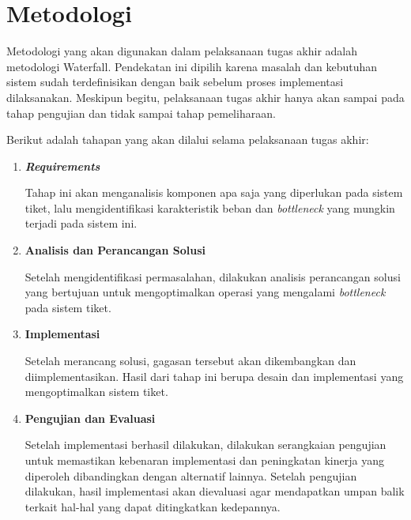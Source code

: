 \section{Metodologi}

Metodologi yang akan digunakan dalam pelaksanaan tugas akhir adalah metodologi Waterfall. Pendekatan ini dipilih karena masalah dan kebutuhan sistem sudah terdefinisikan dengan baik sebelum proses implementasi dilaksanakan. Meskipun begitu, pelaksanaan tugas akhir hanya akan sampai pada tahap pengujian dan tidak sampai tahap pemeliharaan.

Berikut adalah tahapan yang akan dilalui selama pelaksanaan tugas akhir:

\begin{enumerate}
      \item \textbf{\textit{Requirements}}

            Tahap ini akan menganalisis komponen apa saja yang diperlukan pada sistem tiket, lalu mengidentifikasi karakteristik beban dan \textit{bottleneck} yang mungkin terjadi pada sistem ini.

      \item \textbf{Analisis dan Perancangan Solusi}

            Setelah mengidentifikasi permasalahan, dilakukan analisis perancangan solusi yang bertujuan untuk mengoptimalkan operasi yang mengalami \textit{bottleneck} pada sistem tiket.

      \item \textbf{Implementasi}

            Setelah merancang solusi, gagasan tersebut akan dikembangkan dan diimplementasikan. Hasil dari tahap ini berupa desain dan implementasi yang mengoptimalkan sistem tiket.

      \item \textbf{Pengujian dan Evaluasi}

            Setelah implementasi berhasil dilakukan, dilakukan serangkaian pengujian untuk memastikan kebenaran implementasi dan peningkatan kinerja yang diperoleh dibandingkan dengan alternatif lainnya. Setelah pengujian dilakukan, hasil implementasi akan dievaluasi agar mendapatkan umpan balik terkait hal-hal yang dapat ditingkatkan kedepannya.

\end{enumerate}